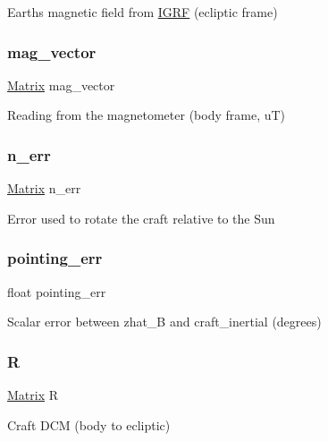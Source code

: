 Earth\textquotesingle{}s magnetic field from \mbox{\hyperlink{struct_i_g_r_f}{I\+G\+RF}} (ecliptic frame) \mbox{\label{struct_a_c_s_type_a4b82b0a178354dcc8761b1bc5d9e3e90}} 
\subsubsection{\texorpdfstring{mag\_vector}{mag\_vector}}
{\footnotesize\ttfamily \mbox{\hyperlink{struct___matrix}{Matrix}} mag\+\_\+vector}

Reading from the magnetometer (body frame, uT) \mbox{\label{struct_a_c_s_type_af580c1b977603405c4a17645652865fc}} 
\subsubsection{\texorpdfstring{n\_err}{n\_err}}
{\footnotesize\ttfamily \mbox{\hyperlink{struct___matrix}{Matrix}} n\+\_\+err}

Error used to rotate the craft relative to the Sun \mbox{\label{struct_a_c_s_type_a4c6fe6211cef14e0d66f51e5aff2c485}} 
\subsubsection{\texorpdfstring{pointing\_err}{pointing\_err}}
{\footnotesize\ttfamily float pointing\+\_\+err}

Scalar error between zhat\+\_\+B and craft\+\_\+inertial (degrees) \mbox{\label{struct_a_c_s_type_a72851c393b49a2b488e51a678b90135b}} 
\subsubsection{\texorpdfstring{R}{R}}
{\footnotesize\ttfamily \mbox{\hyperlink{struct___matrix}{Matrix}} R}

Craft D\+CM (body to ecliptic) \mbox{\label{struct_a_c_s_type_a9b4fd46706c2ce0ad8a2df8038ac915e}} 
